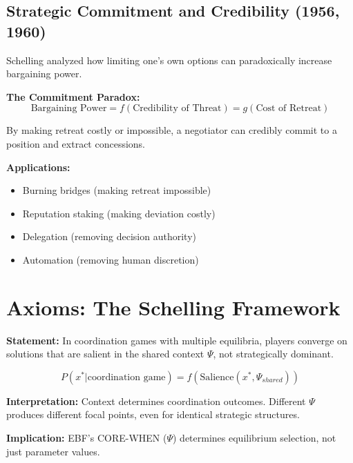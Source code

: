 \subsection{Strategic Commitment and Credibility (1956, 1960)}

Schelling analyzed how limiting one's own options can paradoxically increase
bargaining power.

\textbf{The Commitment Paradox:}
\begin{equation}
\text{Bargaining Power} = f(\text{Credibility of Threat}) = g(\text{Cost of Retreat})
\label{eq:ts-commitment}
\end{equation}

By making retreat costly or impossible, a negotiator can credibly commit to a
position and extract concessions.

\textbf{Applications:}
\begin{itemize}
\item Burning bridges (making retreat impossible)
\item Reputation staking (making deviation costly)
\item Delegation (removing decision authority)
\item Automation (removing human discretion)
\end{itemize}


\section{Axioms: The Schelling Framework}
\label{sec:ts-axioms}

\begin{tcolorbox}[colback=gray!5!white, colframe=gray!75!black,
    title=Axiom TS-1: Focal Point Salience]
\textbf{Statement:} In coordination games with multiple equilibria, players
converge on solutions that are salient in the shared context $\Psi$, not
strategically dominant.

\begin{equation}
P(x^* | \text{coordination game}) = f(\text{Salience}(x^*, \Psi_{shared}))
\end{equation}

\textbf{Interpretation:} Context determines coordination outcomes. Different
$\Psi$ produces different focal points, even for identical strategic structures.

\textbf{Implication:} EBF's CORE-WHEN ($\Psi$) determines equilibrium selection,
not just parameter values.
\end{tcolorbox}

